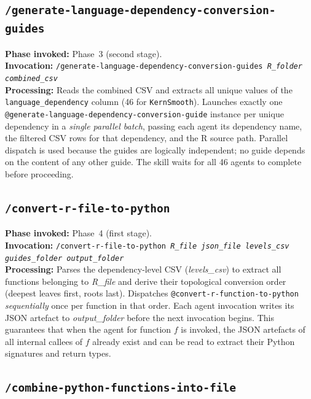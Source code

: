 \documentclass[12pt,a4paper]{article}
\makeatletter
\newcommand{\agent}[1]{\texttt{@#1}}
\newcommand{\pkg}[1]{\texttt{#1}}
\makeatother
\begin{document}
\subsection{\texttt{/generate-language-dependency-conversion-guides}}
\label{supp:skill-gen-guides}

\textbf{Phase invoked:} Phase~3 (second stage).\\
\textbf{Invocation:} \texttt{/generate-language-dependency-conversion-guides \textit{R\_folder} \textit{combined\_csv}}\\
\textbf{Processing:} Reads the combined CSV and extracts all unique values of the \texttt{language\_dependency} column (46 for \pkg{KernSmooth}). Launches exactly one \agent{generate-language-dependency-conversion-guide} instance per unique dependency in a \textit{single parallel batch}, passing each agent its dependency name, the filtered CSV rows for that dependency, and the R source path. Parallel dispatch is used because the guides are logically independent; no guide depends on the content of any other guide. The skill waits for all 46 agents to complete before proceeding.

\subsection{\texttt{/convert-r-file-to-python}}
\label{supp:skill-convert-file}

\textbf{Phase invoked:} Phase~4 (first stage).\\
\textbf{Invocation:} \texttt{/convert-r-file-to-python \textit{R\_file} \textit{json\_file} \textit{levels\_csv} \textit{guides\_folder} \textit{output\_folder}}\\
\textbf{Processing:} Parses the dependency-level CSV (\textit{levels\_csv}) to extract all functions belonging to \textit{R\_file} and derive their topological conversion order (deepest leaves first, roots last). Dispatches \agent{convert-r-function-to-python} \textit{sequentially} once per function in that order. Each agent invocation writes its JSON artefact to \textit{output\_folder} before the next invocation begins. This guarantees that when the agent for function $f$ is invoked, the JSON artefacts of all internal callees of $f$ already exist and can be read to extract their Python signatures and return types.

\subsection{\texttt{/combine-python-functions-into-file}}
\label{supp:skill-combine}
\end{document}
